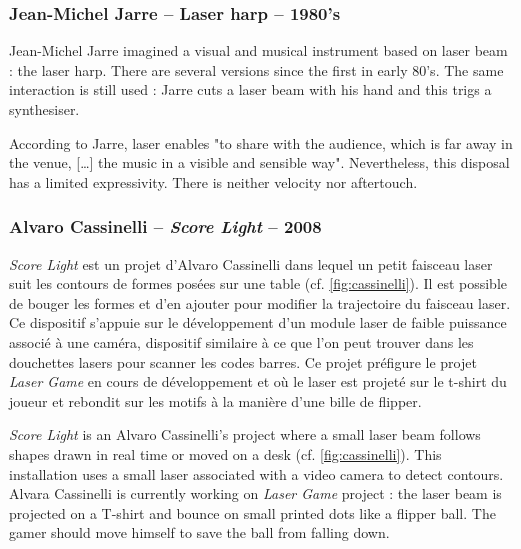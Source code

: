 \begin{en}
\subsubsection{Jean-Michel Jarre -- Laser harp -- 1980's}
Jean-Michel Jarre imagined a visual and musical instrument based on laser beam : the laser harp.
There are several versions since the first in early 80's.
The same interaction is still used : Jarre cuts a laser beam with his hand and this trigs a synthesiser. 

According to Jarre, laser enables "to share with the audience, which is far away in the venue, [\dots] the music in a visible and sensible way".
Nevertheless, this disposal has a limited expressivity.
There is neither velocity nor aftertouch.
\end{en}


\subsubsection{Alvaro Cassinelli -- \textit{Score Light} -- 2008}

\begin{fr}
\textit{Score Light} est un projet d'Alvaro Cassinelli dans lequel un petit faisceau laser suit les contours de formes posées sur une table (cf. \ref{fig:cassinelli}). 
Il est possible de bouger les formes et d'en ajouter pour modifier la trajectoire du faisceau laser. 
Ce dispositif s'appuie sur le développement d'un module laser de faible puissance associé à une caméra, dispositif similaire à ce que l'on peut trouver dans les douchettes lasers pour scanner les codes barres.
Ce projet préfigure le projet \textit{Laser Game} en cours de développement et où le laser est projeté sur le t-shirt du joueur et rebondit sur les motifs à la manière d'une bille de flipper.
\end{fr}

\begin{en}
\textit{Score Light} is an Alvaro Cassinelli's project where a small laser beam follows shapes drawn in real time or moved on a desk (cf. \ref{fig:cassinelli}).
This installation uses a small laser associated with a video camera to detect contours.
Alvara Cassinelli is currently working on \textit{Laser Game} project : the laser beam is projected on a T-shirt and bounce on small printed dots like a flipper ball.
The gamer should move himself to save the ball from falling down.
\end{en}

